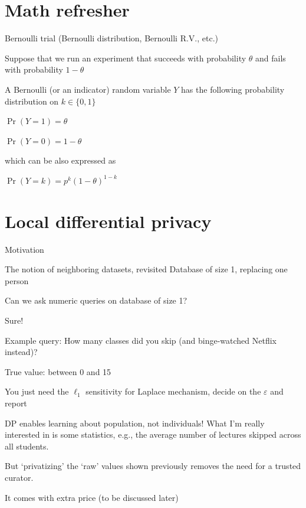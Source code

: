\documentclass[12pt,aspectratio=169,handout]{beamer}
\begin{document}
\section{Math refresher}

\begin{frame}{Bernoulli trial (Bernoulli distribution, Bernoulli R.V., etc.)}

Suppose that we run an experiment that succeeds with probability $\theta$ and fails with probability $1 - \theta$

A Bernoulli (or an indicator) random variable $Y$ has the following probability distribution on $k \in \{0, 1\}$

$\Pr(Y = 1) = \theta$

$\Pr(Y = 0) = 1 - \theta$

which can be also expressed as

$\Pr(Y = k)=p^{k}(1-\theta)^{1-k}$
\end{frame}


\section{Local differential privacy}

\begin{frame}{Motivation}

\begin{block}{The notion of neighboring datasets, revisited}
Database of size 1, replacing one person
\end{block}
Can we ask numeric queries on database of size 1?

\pause

Sure!

Example query: How many classes did you skip (and binge-watched Netflix instead)?

True value: between 0 and 15

You just need the $\ell_1$ sensitivity for Laplace mechanism, decide on the $\varepsilon$ and report

\end{frame}


\begin{frame}{DP enables learning about population, not individuals!}
What I'm really interested in is some statistics, e.g., the average number of lectures skipped across all students.

But `privatizing' the `raw' values shown previously removes the need for a trusted curator.

It comes with extra price (to be discussed later)

\end{frame}
\end{document}
